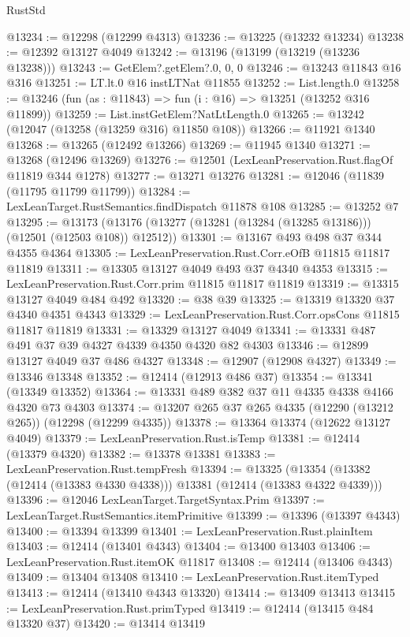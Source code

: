 \begin{lexlean}{RustStd}
\begin{coremodule}
@13234 := @12298 (@12299 @4313)
@13236 := @13225 (@13232 @13234)
@13238 := @12392 @13127 @4049
@13242 := @13196 (@13199 (@13219 (@13236 @13238)))
@13243 := GetElem?.getElem?.{0, 0, 0}
@13246 := @13243 @11843 @16 @316
@13251 := LT.lt.{0} @16 instLTNat @11855
@13252 := List.length.{0}
@13258 := @13246 (fun (as : @11843) => fun (i : @16) => @13251 (@13252 @316 @11899))
@13259 := List.instGetElem?NatLtLength.{0}
@13265 := @13242 (@12047 (@13258 (@13259 @316) @11850 @108))
@13266 := @11921 @1340
@13268 := @13265 (@12492 @13266)
@13269 := @11945 @1340
@13271 := @13268 (@12496 @13269)
@13276 := @12501 (LexLeanPreservation.Rust.flagOf @11819 @344 @1278)
@13277 := @13271 @13276
@13281 := @12046 (@11839 (@11795 @11799 @11799))
@13284 := LexLeanTarget.RustSemantics.findDispatch @11878 @108
@13285 := @13252 @7
@13295 := @13173 (@13176 (@13277 (@13281 (@13284 (@13285 @13186))) (@12501 (@12503 @108)) @12512))
@13301 := @13167 @493 @498 @37 @344 @4355 @4364
@13305 := LexLeanPreservation.Rust.Corr.eOfB @11815 @11817 @11819
@13311 := @13305 @13127 @4049 @493 @37 @4340 @4353
@13315 := LexLeanPreservation.Rust.Corr.prim @11815 @11817 @11819
@13319 := @13315 @13127 @4049 @484 @492
@13320 := @38 @39
@13325 := @13319 @13320 @37 @4340 @4351 @4343
@13329 := LexLeanPreservation.Rust.Corr.opsCons @11815 @11817 @11819
@13331 := @13329 @13127 @4049
@13341 := @13331 @487 @491 @37 @39 @4327 @4339 @4350 @4320 @82 @4303
@13346 := @12899 @13127 @4049 @37 @486 @4327
@13348 := @12907 (@12908 @4327)
@13349 := @13346 @13348
@13352 := @12414 (@12913 @486 @37)
@13354 := @13341 (@13349 @13352)
@13364 := @13331 @489 @382 @37 @11 @4335 @4338 @4166 @4320 @73 @4303
@13374 := @13207 @265 @37 @265 @4335 (@12290 (@13212 @265)) (@12298 (@12299 @4335))
@13378 := @13364 @13374 (@12622 @13127 @4049)
@13379 := LexLeanPreservation.Rust.isTemp
@13381 := @12414 (@13379 @4320)
@13382 := @13378 @13381
@13383 := LexLeanPreservation.Rust.tempFresh
@13394 := @13325
    (@13354 (@13382 (@12414 (@13383 @4330 @4338))) @13381 (@12414 (@13383 @4322 @4339)))
@13396 := @12046 LexLeanTarget.TargetSyntax.Prim
@13397 := LexLeanTarget.RustSemantics.itemPrimitive
@13399 := @13396 (@13397 @4343)
@13400 := @13394 @13399
@13401 := LexLeanPreservation.Rust.plainItem
@13403 := @12414 (@13401 @4343)
@13404 := @13400 @13403
@13406 := LexLeanPreservation.Rust.itemOK @11817
@13408 := @12414 (@13406 @4343)
@13409 := @13404 @13408
@13410 := LexLeanPreservation.Rust.itemTyped
@13413 := @12414 (@13410 @4343 @13320)
@13414 := @13409 @13413
@13415 := LexLeanPreservation.Rust.primTyped
@13419 := @12414 (@13415 @484 @13320 @37)
@13420 := @13414 @13419

\end{coremodule}
\end{lexlean}
